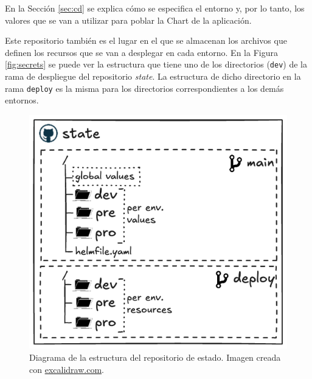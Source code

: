 En la Sección \ref{sec:cd} se explica cómo se especifica el entorno y, por lo tanto, los valores que se van a utilizar para poblar la Chart de la aplicación.

Este repositorio también es el lugar en el que se almacenan los archivos que definen los recursos que se van a desplegar en cada entorno. En la Figura \ref{fig:secrets} se puede ver la estructura que tiene uno de los directorios (\texttt{dev}) de la rama de despliegue del repositorio \textit{state}. La estructura de dicho directorio en la rama \texttt{deploy} es la misma para los directorios correspondientes a los demás entornos.

\begin{figure}[h]
  \centerline{\includegraphics[width=12cm]{figuras/state}}
  \caption{Diagrama de la estructura del repositorio de estado. Imagen creada con \href{https://excalidraw.com}{excalidraw.com}.}
  \label{fig:state}
\end{figure}

